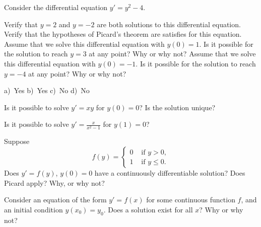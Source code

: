 \begin{exercise}
Consider the differential equation $y' = y^2 - 4$.
\begin{tasks}
\task Verify that $y=2$ and $y=-2$ are both solutions to this differential equation.
\task Verify that the hypotheses of Picard's theorem are satisfies for this equation.
\task Assume that we solve this differential equation with $y(0) = 1$. Is it possible for the solution to reach $y=3$ at any point? Why or why not?
\task Assume that we solve this differential equation with $y(0) = -1$. Is it possible for the solution to reach $y=-4$ at any point? Why or why not?
\end{tasks}
\end{exercise}
\comboSol{%
}
{%
a)~Yes \quad b)~Yes \quad c)~No \quad d)~No
}

\begin{exercise}\ansMark%
Is it possible to solve $y' = xy$ for $y(0) = 0$?  Is the solution unique?
\end{exercise}

\begin{exercise}\ansMark%
Is it possible to solve $y' = \frac{x}{x^2-1}$ for $y(1) = 0$?
\end{exercise}

\begin{exercise}[tricky]\ansMark%
Suppose
\begin{equation*}
f(y) =
\begin{cases}
0 & \text{ if $y > 0$}, \\
1 & \text{ if $y \leq 0$} .
\end{cases}
\end{equation*}
Does $y' = f(y)$, $y(0) = 0$ have a continuously differentiable solution?  Does Picard apply?  Why, or why not?
\end{exercise}

\begin{exercise}\ansMark%
Consider an equation of the form $y' = f(x)$ for some continuous function
$f$, and an initial condition $y(x_0) = y_0$.  Does a
solution exist for all $x$?  Why or why not?
\end{exercise}
